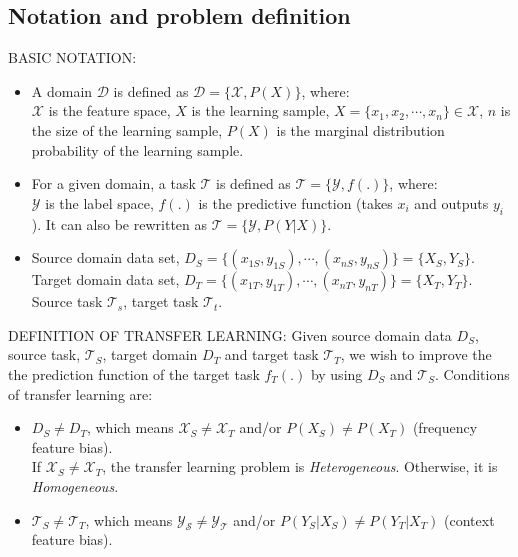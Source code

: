   \subsection{Notation and problem definition}
  \par BASIC NOTATION:
  \begin{itemize}[noitemsep]
      \item A domain $\mathcal{D}$ is defined as $\mathcal{D} = \{\mathcal{X}, P(X)\}$, where:\\
      $\mathcal{X}$ is the feature space, $X$ is the learning sample, $X = \{x_1,x_2,\cdots,x_n\} \in \mathcal{X}$, $n$ is the size of the learning sample, $P(X)$ is the marginal distribution probability of the learning sample.

      \item For a given domain, a task $\mathcal{T}$ is defined as $\mathcal{T} = \{\mathcal{Y}, f(.)\}$, where:\\
      $\mathcal{Y}$ is the label space, $f(.)$ is the predictive function (takes $x_i$ and outputs $y_i$). It can also be rewritten as $\mathcal{T} = \{\mathcal{Y}, P(Y|X)\}$.

      \item Source domain data set, $D_S = \{(x_{1S},y_{1S}),\cdots,(x_{nS},y_{nS})\} = \{X_S,Y_S\}$.\\ Target domain data set, $D_T = \{(x_{1T},y_{1T}),\cdots,(x_{nT},y_{nT})\}= \{X_T,Y_T\}$.\\
      Source task $\mathcal{T}_s$, target task $\mathcal{T}_t$.
  \end{itemize}


  \par DEFINITION OF TRANSFER LEARNING: Given source domain data $D_S$, source task, $\mathcal{T}_S$,  target domain $D_T$ and target task $\mathcal{T}_T$, we wish to improve the the prediction function of the target task $f_T(.)$ by using $D_S$ and $\mathcal{T}_S$. Conditions of transfer learning are:

  \begin{itemize}[noitemsep]
      \item $D_S \neq D_T$, which means $\mathcal{X}_S \neq \mathcal{X}_T$ and/or $P(X_S) \neq P(X_T)$ (frequency feature bias).\\
      If $\mathcal{X}_S \neq \mathcal{X}_T$, the transfer learning problem is \textit{Heterogeneous}. Otherwise, it is \textit{Homogeneous}.

      \item $\mathcal{T}_S \neq \mathcal{T}_T$, which means $\mathcal{Y_S} \neq \mathcal{Y_T}$ and/or $P(Y_S|X_S) \neq P(Y_T|X_T)$ (context feature bias).
  \end{itemize}

